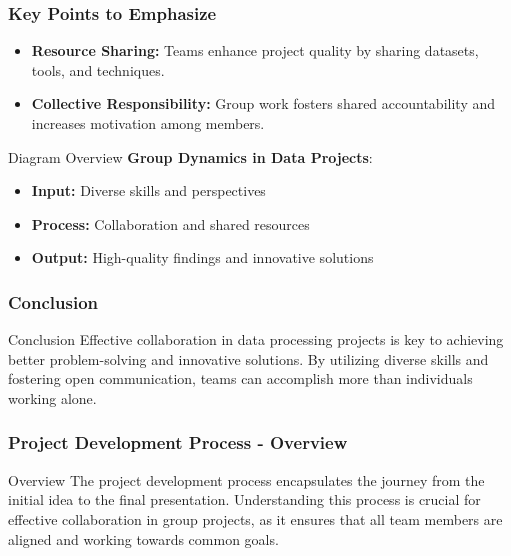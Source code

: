 \documentclass[aspectratio=169]{beamer}
\begin{document}
\begin{frame}[fragile]
    \frametitle{Key Points to Emphasize}
    \begin{itemize}
        \item \textbf{Resource Sharing:} Teams enhance project quality by sharing datasets, tools, and techniques.
        \item \textbf{Collective Responsibility:} Group work fosters shared accountability and increases motivation among members.
    \end{itemize}

    \begin{block}{Diagram Overview}
        \textbf{Group Dynamics in Data Projects}:
        \begin{itemize}
            \item \textbf{Input:} Diverse skills and perspectives
            \item \textbf{Process:} Collaboration and shared resources
            \item \textbf{Output:} High-quality findings and innovative solutions
        \end{itemize}
    \end{block}
\end{frame}

\begin{frame}[fragile]
    \frametitle{Conclusion}
    \begin{block}{Conclusion}
        Effective collaboration in data processing projects is key to achieving better problem-solving and innovative solutions. By utilizing diverse skills and fostering open communication, teams can accomplish more than individuals working alone.
    \end{block}
\end{frame}

\begin{frame}[fragile]
    \frametitle{Project Development Process - Overview}
    \begin{block}{Overview}
        The project development process encapsulates the journey from the initial idea to the final presentation. Understanding this process is crucial for effective collaboration in group projects, as it ensures that all team members are aligned and working towards common goals.
    \end{block}
\end{frame}
\end{document}
